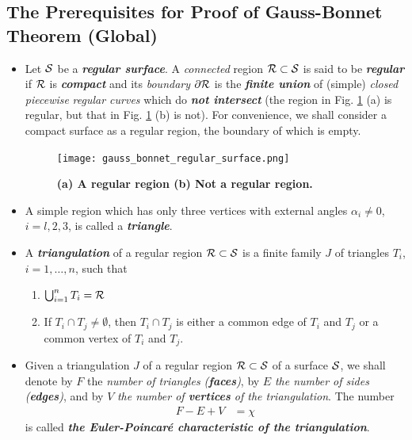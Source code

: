 \documentclass[11pt]{article}
\begin{document}
\subsection{The Prerequisites for Proof of  Gauss-Bonnet Theorem (Global)}
\begin{itemize}
\item \begin{definition}
Let ${\mathcal S}$ be a \emph{\textbf{regular surface}}. A \emph{connected} region ${\mathcal R} \subset {\mathcal S}$ is said to be \emph{\textbf{regular}} if ${\mathcal R}$ is \emph{\textbf{compact}} and its \emph{boundary} $\partial {\mathcal R}$ is the \emph{\textbf{finite union}} of (simple) \emph{closed} \emph{piecewise} \emph{regular curves} which do  \emph{\textbf{not intersect}} (the region in Fig. \ref{fig: gauss_bonnet_regular_surface} (a) is regular, but that in Fig. \ref{fig: gauss_bonnet_regular_surface} (b) is not). For convenience, we shall consider a compact surface as a regular region, the boundary of which is empty.
\end{definition}

\begin{figure}[htb]
\centering
\begin{minipage}{1\linewidth}
 \centerline{\texttt{[image: gauss\_bonnet\_regular\_surface.png]}}
\end{minipage}
\caption{\scriptsize
\textbf{(a) A regular region (b) Not a regular region. \citep{do1976differential}}}
\label{fig: gauss_bonnet_regular_surface}
\end{figure}

\item A simple region which has only three vertices with external angles $\alpha_i \neq 0$, $i = l, 2, 3$, is called a \emph{\textbf{triangle}}.

\item A \emph{\textbf{triangulation}} of a regular region ${\mathcal R} \subset {\mathcal S}$ is a finite family $J$ of triangles $T_i$, $i= 1,\ldots,n$, such that
\begin{enumerate}
\item $\bigcup_{i=1}^{n}T_{i} = {\mathcal R}$
\item If $T_i \cap T_j  \neq \emptyset$, then $T_i \cap T_j$ is either a common edge of $T_i$ and $T_j$ or a
common vertex of $T_i$ and $T_j$.
\end{enumerate}

\item Given a triangulation $J$ of a regular region ${\mathcal R} \subset {\mathcal S}$  of a surface ${\mathcal S}$, we shall denote by $F$ the \emph{number of triangles (\textbf{faces})}, by $E$ \emph{the number of sides (\textbf{edges})}, and by $V$ \emph{the number of \textbf{vertices} of the triangulation}. The number
\begin{align*}
F - E + V &= \chi
\end{align*} is called \emph{\textbf{the Euler-Poincar\'e characteristic of the triangulation}}.


\end{itemize}
\end{document}
